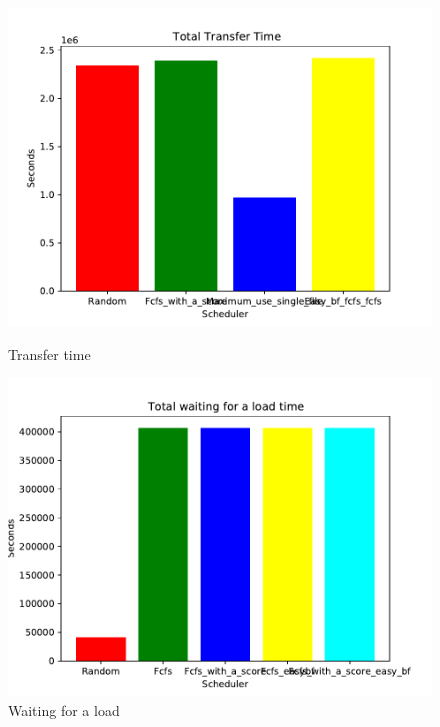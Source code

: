 \documentclass[a4paper]{article}
\begin{document}
\begin{figure}[H] 
  \label{ fig7} 
  \begin{minipage}[b]{0.5\linewidth}
    \centering
    \includegraphics[width=1.11\linewidth]{MBSS/plot/2021-05-23_Total_transfer_time.pdf} 
    \caption{Transfer time} 
    \vspace{4ex}
  \end{minipage}%
  \begin{minipage}[b]{0.5\linewidth}
    \centering
    \includegraphics[width=1.11\linewidth]{MBSS/plot/2021-05-23_Total_waiting_for_a_load_time.pdf} 
    \caption{Waiting for a load} 
    \vspace{4ex}
  \end{minipage} 

\end{figure}
\end{document}

